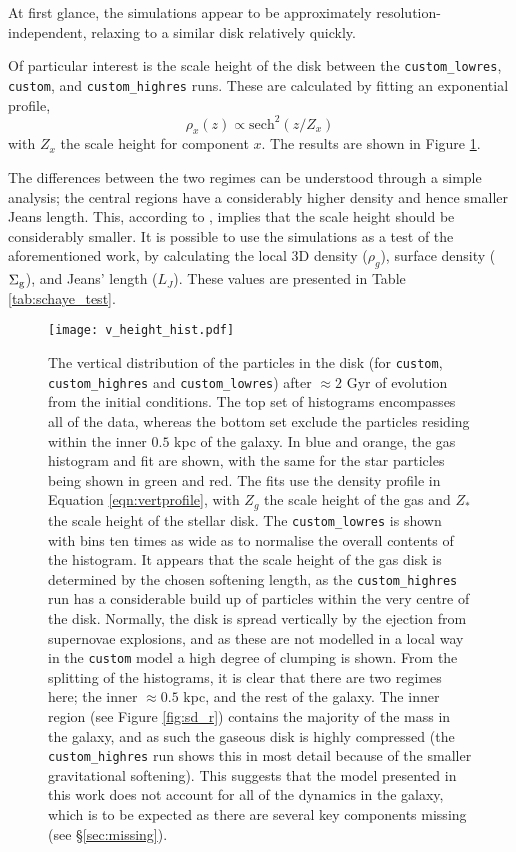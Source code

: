 At first glance, the simulations appear to be approximately resolution-independent, relaxing to a similar disk relatively quickly.

Of particular interest is the scale height of the disk between the {\tt custom\_lowres}, {\tt custom}, and {\tt custom\_highres} runs.
These are calculated by fitting an exponential profile,
$$
    \rho_x(z) \propto \mathrm{sech}^2\left(z/Z_x\right)
$$
with $Z_x$ the scale height for component $x$. The results are shown in Figure \ref{fig:vheighthist}.

The differences between the two regimes can be understood through a simple \citet{jeans_stability_1902} analysis; the central regions have a considerably higher density and hence smaller Jeans length.
This, according to \citet{schaye_model-independent_2001}, implies that the scale height should be considerably smaller.
It is possible to use the simulations as a test of the aforementioned work, by calculating the local 3D density ($\rho_g$), surface density ($\Sigma_\mathrm{g}$), and Jeans' length ($L_J$).
These values are presented in Table \ref{tab:schaye_test}.


\begin{figure}
    \centering
    \texttt{[image: v\_height\_hist.pdf]}
    \caption{The vertical distribution of the particles in the disk (for {\tt custom}, {\tt custom\_highres} and {\tt custom\_lowres}) after $\approx 2$ Gyr of evolution from the initial conditions. The top set of histograms encompasses all of the data, whereas the bottom set exclude the particles residing within the inner $0.5$ kpc of the galaxy. In blue and orange, the gas histogram and fit are shown, with the same for the star particles being shown in green and red. The fits use the density profile in Equation \ref{eqn:vertprofile}, with $Z_g$ the scale height of the gas and $Z_*$ the scale height of the stellar disk. The {\tt custom\_lowres} is shown with bins ten times as wide as to normalise the overall contents of the histogram. It appears that the scale height of the gas disk is determined by the chosen softening length, as the {\tt custom\_highres} run has a considerable build up of particles within the very centre of the disk. Normally, the disk is spread vertically by the ejection from supernovae explosions, and as these are not modelled in a local way in the {\tt custom} model a high degree of clumping is shown. From the splitting of the histograms, it is clear that there are two regimes here; the inner $\approx 0.5$ kpc, and the rest of the galaxy. The inner region (see Figure \ref{fig:sd_r}) contains the majority of the mass in the galaxy, and as such the gaseous disk is highly compressed (the {\tt custom\_highres} run shows this in most detail because of the smaller gravitational softening). This suggests that the model presented in this work does not account for all of the dynamics in the galaxy, which is to be expected as there are several key components missing (see \S \ref{sec:missing}).}
    \label{fig:vheighthist}
\end{figure}
